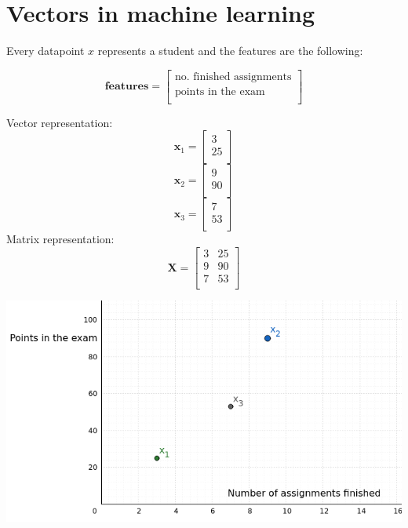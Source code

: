 \documentclass{article}
\begin{document}
\pagebreak

\section{Vectors in machine learning}

Every datapoint $x$ represents a student and the features are the following:

$$
    \textbf{features} =
    \begin{bmatrix}
        \text{no. finished assignments} \\
        \text{points in the exam} \\
    \end{bmatrix}
$$

Vector representation:
$$
    \textbf{x}_1=
    \begin{bmatrix}
        3 \\
        25 \\
    \end{bmatrix}
$$
$$
    \textbf{x}_2=
    \begin{bmatrix}
        9 \\
        90 \\
    \end{bmatrix}
$$
$$
    \textbf{x}_3=
    \begin{bmatrix}
        7 \\
        53 \\
    \end{bmatrix}
$$
Matrix representation:
$$
    \textbf{X}=
    \begin{bmatrix}
        3 & 25 \\
        9 & 90 \\
        7 & 53 \\
    \end{bmatrix}
$$

\vspace{2cm}
\begin{center}
    \hspace{-2cm}\includegraphics[width=1\linewidth]{img/example_dataset.png}
\end{center}
\end{document}
